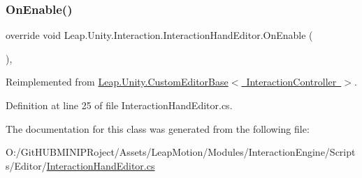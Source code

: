 \subsubsection{\texorpdfstring{OnEnable()}{OnEnable()}}
{\footnotesize\ttfamily override void Leap.\+Unity.\+Interaction.\+Interaction\+Hand\+Editor.\+On\+Enable (\begin{DoxyParamCaption}{ }\end{DoxyParamCaption})\hspace{0.3cm}{\ttfamily [protected]}, {\ttfamily [virtual]}}



Reimplemented from \mbox{\hyperlink{class_leap_1_1_unity_1_1_custom_editor_base_a2268bc01655342bd3da5ae015bfa2f93}{Leap.\+Unity.\+Custom\+Editor\+Base$<$ Interaction\+Controller $>$}}.



Definition at line 25 of file Interaction\+Hand\+Editor.\+cs.



The documentation for this class was generated from the following file\+:\begin{DoxyCompactItemize}
\item 
O\+:/\+Git\+H\+U\+B\+M\+I\+N\+I\+P\+Roject/\+Assets/\+Leap\+Motion/\+Modules/\+Interaction\+Engine/\+Scripts/\+Editor/\mbox{\hyperlink{_interaction_hand_editor_8cs}{Interaction\+Hand\+Editor.\+cs}}\end{DoxyCompactItemize}
